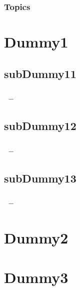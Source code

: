 \documentclass{beamer}
\begin{document}
   
   \begin{frame}
      \frametitle{Topics}
      \begin{multicols}{2}
         \tableofcontents
      \end{multicols}
   \end{frame}
   
   
   
   \section{Dummy1}
   
   \subsection{subDummy11}
   
   \begin{frame}
      \frametitle{\insertsection\ -- \insertsubsection}
      \blindtext
   \end{frame}
   
   \subsection{subDummy12}
   
   \begin{frame}
      \frametitle{\insertsection\ -- \insertsubsection}
      \blindtext
   \end{frame}
   
   \subsection{subDummy13}
   
   \begin{frame}
      \frametitle{\insertsection\ -- \insertsubsection}
      \blindtext
   \end{frame}
   
   \section{Dummy2}
   
   \begin{frame}
      \frametitle{\insertsection}
      \blindtext
   \end{frame}
   
   \section{Dummy3}
   
\end{document}
